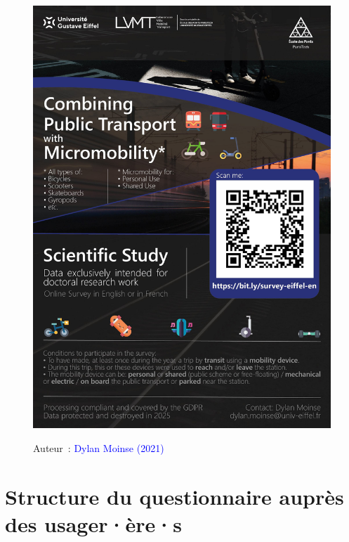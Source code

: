     \begin{figure}[H]\vspace*{4pt}
        \caption*{}
        \centerline{\includegraphics[width=1\columnwidth]{src/Figures/Annexes/EN_Affiche_questionnaire.jpg}}
        \vspace{5pt}
        \begin{flushright}\scriptsize{
        Auteur~: \textcolor{blue}{Dylan Moinse (2021)}
        }\end{flushright}
    \end{figure}

    \newpage
    \newpage
\section{Structure du questionnaire auprès des usager·ère·s}
    \label{annexes:structure-questionnaire-usagers}

